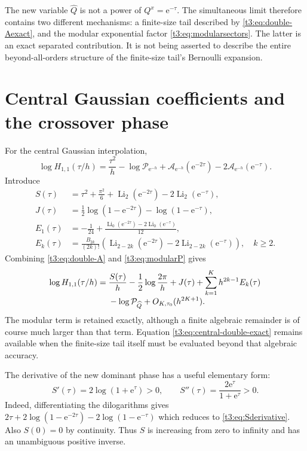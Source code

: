 \documentclass[11pt,openany]{book}
\numberwithin{equation}{chapter}
\theoremstyle{plain}
\theoremstyle{definition}
\theoremstyle{remark}
\newcommand{\ee}{\mathrm e}
\newcommand{\Li}{\operatorname{Li}}\newcommand{\rad}{\operatorname{rad}}
\begin{document}
The new variable $\widehat Q$ is not a power of $Q^x=\ee^{-\tau}$. The simultaneous limit therefore contains two different mechanisms: a finite-size tail described by \eqref{t3:eq:double-Aexact}, and the modular exponential factor \eqref{t3:eq:modularsectors}. The latter is an exact separated contribution. It is not being asserted to describe the entire beyond-all-orders structure of the finite-size tail's Bernoulli expansion.

\section{Central Gaussian coefficients and the crossover phase}

For the central Gaussian interpolation,
\begin{equation}\label{t3:eq:central-double-exact}
 \log H_{1,1}(\tau/h)
 =\frac{\tau^2}{h}-\log\mathcal P_{\ee^{-h}}
 +\mathcal A_{\ee^{-h}}(\ee^{-2\tau})
 -2\mathcal A_{\ee^{-h}}(\ee^{-\tau}).
\end{equation}
Introduce
\begin{align}
 S(\tau)&=\tau^2+\frac{\pi^2}{6}
               +\Li_2(\ee^{-2\tau})-2\Li_2(\ee^{-\tau}),
 \label{t3:eq:Sphase}\\
 J(\tau)&=\frac12\log(1-\ee^{-2\tau})
                  -\log(1-\ee^{-\tau}),\label{t3:eq:Jamp}\\
 E_1(\tau)&=-\frac1{24}
       +\frac{\Li_0(\ee^{-2\tau})-2\Li_0(\ee^{-\tau})}{12},
 \label{t3:eq:E1}\\
 E_k(\tau)&=\frac{B_{2k}}{(2k)!}
       \left(\Li_{2-2k}(\ee^{-2\tau})
                 -2\Li_{2-2k}(\ee^{-\tau})\right),\quad k\ge2.
 \label{t3:eq:Ek}
\end{align}
Combining \eqref{t3:eq:double-A} and \eqref{t3:eq:modularP} gives
\begin{align}\label{t3:eq:central-double-asympt}
 \log H_{1,1}(\tau/h)
 ={}&\frac{S(\tau)}h-\frac12\log\frac{2\pi}{h}+J(\tau)
     +\sum_{k=1}^K h^{2k-1}E_k(\tau)\\[-0.3em]
 &-\log\mathcal P_{\widehat Q}
     +O_{K,\tau_0}(h^{2K+1}).\notag
\end{align}
The modular term is retained exactly, although a finite algebraic remainder is of course much larger than that term. Equation \eqref{t3:eq:central-double-exact} remains available when the finite-size tail itself must be evaluated beyond that algebraic accuracy.

The derivative of the new dominant phase has a useful elementary form:
\begin{equation}\label{t3:eq:Sderivative}
 \boxed{\displaystyle
 S'(\tau)=2\log(1+\ee^{\tau})>0,\qquad
 S''(\tau)=\frac{2\ee^\tau}{1+\ee^\tau}>0.}
\end{equation}
Indeed, differentiating the dilogarithms gives
$2\tau+2\log(1-\ee^{-2\tau})-2\log(1-\ee^{-\tau})$
which reduces to \eqref{t3:eq:Sderivative}. Also $S(0)=0$ by continuity. Thus $S$ is increasing from zero to infinity and has an unambiguous positive inverse.
\end{document}
